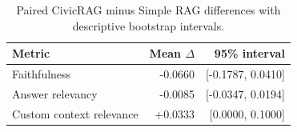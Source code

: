 \begin{table}[htbp]\centering\small
\caption{Paired CivicRAG minus Simple RAG differences with descriptive bootstrap intervals.}\label{tab:ragas-intervals}
\begin{tabularx}{\linewidth}{Xrr}\toprule
Metric & Mean $\Delta$ & 95\% interval\\\midrule
Faithfulness & -0.0660 & [-0.1787, 0.0410]\\
Answer relevancy & -0.0085 & [-0.0347, 0.0194]\\
Custom context relevance & +0.0333 & [0.0000, 0.1000]\\
\bottomrule\end{tabularx}\end{table}
